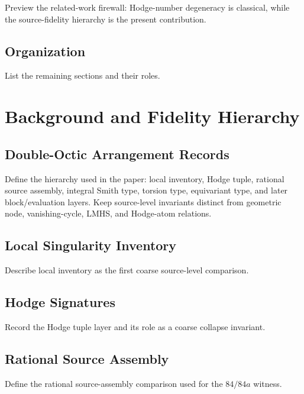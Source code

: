Preview the related-work firewall: Hodge-number degeneracy is classical, while
the source-fidelity hierarchy is the present contribution.

\subsection{Organization}

List the remaining sections and their roles.

\section{Background and Fidelity Hierarchy}\label{sec:background}


\subsection{Double-Octic Arrangement Records}

Define the hierarchy used in the paper: local inventory, Hodge tuple, rational
source assembly, integral Smith type, torsion type, equivariant type, and later
block/evaluation layers.  Keep source-level invariants distinct from geometric
node, vanishing-cycle, LMHS, and Hodge-atom relations.

\subsection{Local Singularity Inventory}

Describe local inventory as the first coarse source-level comparison.

\subsection{Hodge Signatures}

Record the Hodge tuple layer and its role as a coarse collapse invariant.

\subsection{Rational Source Assembly}

Define the rational source-assembly comparison used for the \(84/84a\)
witness.

